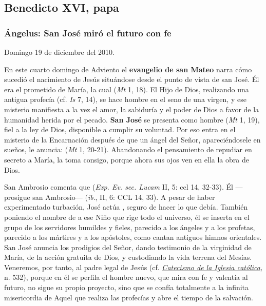 \begin{body}
\begin{body}
\subsection{Benedicto XVI, papa}

\subsubsection{Ángelus: San José miró el futuro con fe}

Domingo 19 de diciembre del 2010.

En este cuarto domingo de Adviento el \textbf{evangelio de san Mateo} narra cómo sucedió el nacimiento de Jesús situándose desde el punto de vista de san José. Él era el prometido de María, la cual  (\emph{Mt} 1, 18). El Hijo de Dios, realizando una antigua profecía (cf. \emph{Is} 7, 14), se hace hombre en el seno de una virgen, y ese misterio manifiesta a la vez el amor, la sabiduría y el poder de Dios a favor de la humanidad herida por el pecado. \textbf{San José} se presenta como hombre  (\emph{Mt} 1, 19), fiel a la ley de Dios, disponible a cumplir su voluntad. Por eso entra en el misterio de la Encarnación después de que un ángel del Señor, apareciéndosele en sueños, le anuncia:  (\emph{Mt} 1, 20-21). Abandonando el pensamiento de repudiar en secreto a María, la toma consigo, porque ahora sus ojos ven en ella la obra de Dios.

San Ambrosio comenta que  (\emph{Exp. Ev. sec. Lucam} II, 5: ccl 14, 32-33). Él ---prosigue san Ambrosio---  (\emph{ib}., II, 6: CCL 14, 33). A pesar de haber experimentado turbación, José actúa , seguro de hacer lo que debía. También poniendo el nombre de  a ese Niño que rige todo el universo, él se inserta en el grupo de los servidores humildes y fieles, parecido a los ángeles y a los profetas, parecido a los mártires y a los apóstoles, como cantan antiguos himnos orientales. San José anuncia los prodigios del Señor, dando testimonio de la virginidad de María, de la acción gratuita de Dios, y custodiando la vida terrena del Mesías. Veneremos, por tanto, al padre legal de Jesús (cf. \emph{\href{http://www.vatican.va/archive/catechism_sp/p122a3p3_sp.html\#II\%20Los\%20misterios\%20de\%20la\%20infancia\%20y\%20de\%20la\%20vida\%20oculta\%20de\%20Jes\%C3\%BAs}{Catecismo de la Iglesia católica},} n. 532), porque en él se perfila el hombre nuevo, que mira con fe y valentía al futuro, no sigue su propio proyecto, sino que se confía totalmente a la infinita misericordia de Aquel que realiza las profecías y abre el tiempo de la salvación.


\end{body}
\end{body}
